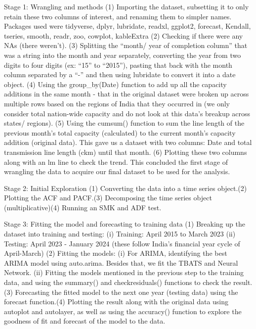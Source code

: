 \documentclass[
]{article}
\begin{document}
Stage 1: Wrangling and methods \n (1) Importing the dataset, subsetting
it to only retain these two columns of interest, and renaming them to
simpler names. Packages used were tidyverse, dplyr, lubridate, readxl,
ggplot2, forecast, Kendall, tseries, smooth, readr, zoo, cowplot,
kableExtra \n (2) Checking if there were any NAs (there weren't). \n (3)
Splitting the ``month/ year of completion column'' that was a string
into the month and year separately, converting the year from two digits
to four digits (ex: ``15'' to ``2015''), pasting that back with the
month column separated by a ``-'' and then using lubridate to convert it
into a date object. \n (4) Using the group\_by(Date) function to add up
all the capacity additions in the same month - that in the original
dataset were broken up across multiple rows based on the regions of
India that they occurred in (we only consider total nation-wide capacity
and do not look at this data's breakup across states/ regions). \n (5)
Using the cumsum() function to sum the line length of the previous
month's total capacity (calculated) to the current month's capacity
addition \n (original data). This gave us a dataset with two columns:
Date and total transmission line length (ckm) until that month. \n (6)
Plotting these two columns along with an lm line to check the trend. \n
This concluded the first stage of wrangling the data to acquire our
final dataset to be used for the analysis.

Stage 2: Initial Exploration \n (1) Converting the data into a time
series object.\n (2) Plotting the ACF and PACF.\n (3) Decomposing the
time series object (multiplicative)\n (4) Running an SMK and ADF test.\n

Stage 3: Fitting the model and forecasting to training data \n (1)
Breaking up the dataset into training and testing: \n (i) Training:
April 2015 to March 2023 \n (ii) Testing: April 2023 - January 2024 \n
(these follow India's financial year cycle of April-March) \n (2)
Fitting the models: \n (i) For ARIMA, identifying the best ARIMA model
using auto.arima. Besides that, we fit the TBATS and Neural Network.\n
(ii) Fitting the models mentioned in the previous step to the training
data, and using the summary() and checkresiduals() functions to check
the result. \n (3) Forecasting the fitted model to the next one year
(testing data) using the forecast function.\n (4) Plotting the result
along with the original data using autoplot and autolayer, as well as
using the accuracy() function to explore the goodness of fit and
forecast of the model to the data.\n
\end{document}
